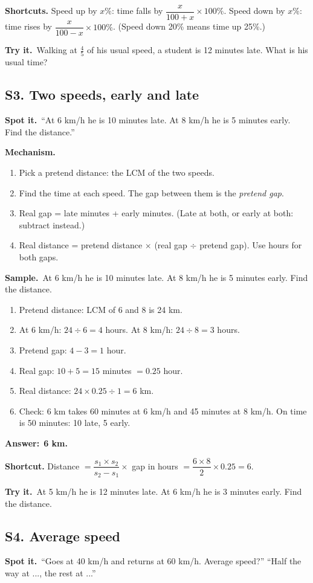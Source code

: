 \documentclass[11pt,a4paper]{article}
\let\oldsubsection\subsection
\renewcommand{\subsection}{\needspace{9\baselineskip}\oldsubsection}
\newcommand{\spot}{\textbf{\color{ember}Spot it.}\ }
\newcommand{\mech}{\textbf{\color{ember}Mechanism.}\ }
\newif\ifkeepsamp
\newcommand{\ans}[1]{\par\nopagebreak\noindent\textbf{\color{ember}Answer:}\ \textbf{#1}\par}
\newcommand{\samp}{\ifkeepsamp\needspace{4\baselineskip}\fi\textbf{\color{ember}Sample.}\ }
\newcommand{\tryit}[1]{\textbf{\color{ember}Try it.}\ #1}
\begin{document}
\textbf{Shortcuts.} Speed up by $x\%$: time falls by $\dfrac{x}{100+x}\times 100\%$. Speed down by $x\%$: time rises by $\dfrac{x}{100-x}\times 100\%$. (Speed down 20\% means time up 25\%.)

\tryit Walking at $\tfrac45$ of his usual speed, a student is 12 minutes late. What is his usual time?

\subsection{S3. Two speeds, early and late}
\spot ``At 6 km/h he is 10 minutes late. At 8 km/h he is 5 minutes early. Find the distance.''

\mech
\begin{enumerate}
\item Pick a pretend distance: the LCM of the two speeds.
\item Find the time at each speed. The gap between them is the \emph{pretend gap}.
\item Real gap = late minutes + early minutes. (Late at both, or early at both: subtract instead.)
\item Real distance = pretend distance $\times$ (real gap $\div$ pretend gap). Use hours for both gaps.
\end{enumerate}

\samp At 6 km/h he is 10 minutes late. At 8 km/h he is 5 minutes early. Find the distance.
\begin{enumerate}
\item Pretend distance: LCM of 6 and 8 is 24 km.
\item At 6 km/h: $24 \div 6 = 4$ hours. At 8 km/h: $24 \div 8 = 3$ hours.
\item Pretend gap: $4 - 3 = 1$ hour.
\item Real gap: $10 + 5 = 15$ minutes $= 0.25$ hour.
\item Real distance: $24 \times 0.25 \div 1 = 6$ km.
\item Check: 6 km takes 60 minutes at 6 km/h and 45 minutes at 8 km/h. On time is 50 minutes: 10 late, 5 early.
\end{enumerate}
\ans{6 km.}

\textbf{Shortcut.} Distance $=\dfrac{s_1 \times s_2}{s_2-s_1}\times$ gap in hours $=\dfrac{6\times 8}{2}\times 0.25=6$.

\tryit At 5 km/h he is 12 minutes late. At 6 km/h he is 3 minutes early. Find the distance.

\subsection{S4. Average speed}
\spot ``Goes at 40 km/h and returns at 60 km/h. Average speed?'' ``Half the way at ..., the rest at ...''
\end{document}
